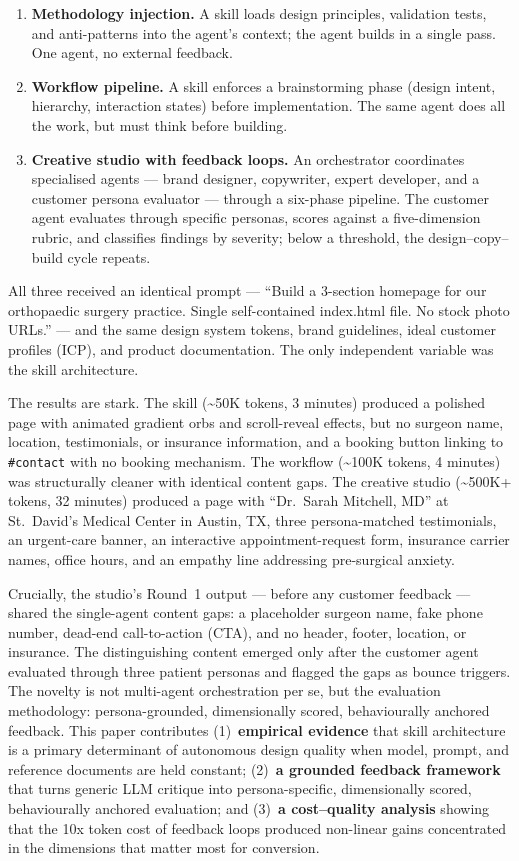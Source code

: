 \documentclass[a4paper]{llncs}
\begin{document}
\begin{enumerate}
\item \textbf{Methodology injection.} A skill loads design principles,
validation tests, and anti-patterns into the agent's context; the agent builds
in a single pass. One agent, no external feedback.
\item \textbf{Workflow pipeline.} A skill enforces a brainstorming phase
(design intent, hierarchy, interaction states) before implementation. The same
agent does all the work, but must think before building.
\item \textbf{Creative studio with feedback loops.} An orchestrator coordinates
specialised agents --- brand designer, copywriter, expert developer, and a
customer persona evaluator --- through a six-phase pipeline. The customer agent
evaluates through specific personas, scores against a five-dimension rubric,
and classifies findings by severity; below a threshold, the
design--copy--build cycle repeats.
\end{enumerate}

All three received an identical prompt --- ``Build a 3-section homepage for our
orthopaedic surgery practice. Single self-contained index.html file. No stock
photo URLs.'' --- and the same design system tokens, brand guidelines, ideal
customer profiles (ICP), and product documentation. The only independent
variable was the skill architecture.

The results are stark. The skill (\textasciitilde50K tokens, 3 minutes)
produced a polished page with animated gradient orbs and scroll-reveal effects,
but no surgeon name, location, testimonials, or insurance information, and a
booking button linking to \texttt{\#contact} with no booking mechanism. The
workflow (\textasciitilde100K tokens, 4 minutes) was structurally cleaner with
identical content gaps. The creative studio (\textasciitilde500K+ tokens,
32 minutes) produced a page with ``Dr.~Sarah Mitchell, MD'' at St.~David's
Medical Center in Austin, TX, three persona-matched testimonials, an
urgent-care banner, an interactive appointment-request form, insurance carrier
names, office hours, and an empathy line addressing pre-surgical anxiety.

Crucially, the studio's Round~1 output --- before any customer feedback ---
shared the single-agent content gaps: a placeholder surgeon name, fake phone
number, dead-end call-to-action (CTA), and no header, footer, location, or
insurance. The distinguishing content emerged only after the customer agent
evaluated through three patient personas and flagged the gaps as bounce
triggers. The novelty is not multi-agent orchestration per se, but the
evaluation methodology: persona-grounded, dimensionally scored, behaviourally
anchored feedback. This paper contributes (1)~\textbf{empirical evidence} that
skill architecture is a primary determinant of autonomous design quality when
model, prompt, and reference documents are held constant; (2)~\textbf{a grounded
feedback framework} that turns generic LLM critique into persona-specific,
dimensionally scored, behaviourally anchored evaluation; and (3)~\textbf{a
cost--quality analysis} showing that the 10x token cost of feedback loops
produced non-linear gains concentrated in the dimensions that matter most for
conversion.
\end{document}
